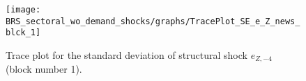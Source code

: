 \begin{figure}[H]
\centering
  \texttt{[image: BRS\_sectoral\_wo\_demand\_shocks/graphs/TracePlot\_SE\_e\_Z\_news\_blck\_1]}\\
    \caption{Trace plot for the standard deviation of structural shock ${e_{Z,-4}}$ (block number 1).}
\end{figure}
